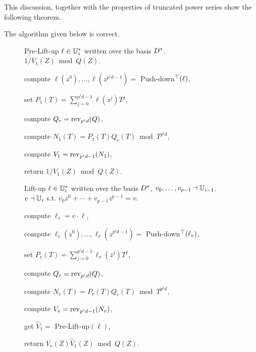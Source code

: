 This discussion, together with the properties of truncated power
series show the following theorem.

\begin{theorem}
  The algorithm  given below is correct.
\end{theorem}

\begin{figure}
  \begin{algorithm}{Pre-Lift-up}
    {$\ell\in\mathbb{U}_i^\ast$ written over the basis $D^\ast$.}
    {$1/V_1(Z) \bmod Q(Z)$.}
  \item \label{alg:pre-lift-up:pow} compute
    $\ell(z^0),\ldots,\ell(z^{p^id-1}) =$ Push-down$^\top(\ell)$,
  \item set $P_1(T) = \sum_{j=0}^{p^id-1}\ell(z^j)T^j$,
  \item \label{alg:pre-lift-up:rev1} compute $Q_r = \operatorname{rev}_{p^id}(Q)$,
  \item \label{alg:pre-lift-up:mult} compute $N_1(T) = P_1(T)Q_r(T)
    \bmod T^{p^id}$,
  \item \label{alg:pre-lift-up:rev2} compute $V_1 =
    \operatorname{rev}_{p^id-1}(N_1)$,
  \item \label{alg:pre-lift-up:inv} return $1 / V_1(Z) \bmod Q(Z)$.
  \end{algorithm}
\end{figure}

\begin{figure}
  \begin{algorithm}{Lift-up}
    {$\ell\in\mathbb{U}_i^\ast$ written over the basis $D^\ast$,
      $v_0,\ldots,v_{p-1}\dashv\mathbb{U}_{i-1}$.}
    {$v\dashv\mathbb{U}_i$ s.t. $v_0z^0 + \cdots + v_{p-1}z^{p-1} = v$.}
  \item \label{alg:lift-up:transmul} compute $\ell_v = v\cdot\ell$,
  \item \label{alg:lift-up:pow} compute
    $\ell_v(z^0),\ldots,\ell_v(z^{p^id-1}) =$ Push-down$^\top(\ell_v)$,
  \item set $P_v(T) = \sum_{j=0}^{p^id-1}\ell_v(z^j)T^j$,
  \item \label{alg:lift-up:rev1} compute $Q_r = \operatorname{rev}_{p^id}(Q)$,
  \item \label{alg:lift-up:mult} compute $N_v(T) = P_v(T)Q_r(T)
    \bmod T^{p^id}$,
  \item \label{alg:lift-up:rev2} compute $V_v = \operatorname{rev}_{p^id-1}(N_v)$,
  \item get $\hat{V}_1 =$ Pre-Lift-up$(\ell)$,
  \item \label{alg:lift-up:mulmod} return $V_v(Z)\hat{V}_1(Z) \bmod Q(Z)$.
  \end{algorithm}
\end{figure}

